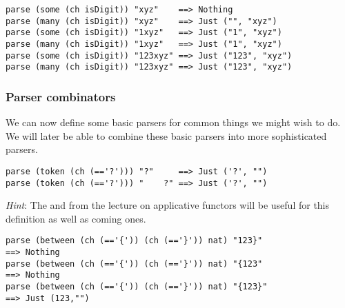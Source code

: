 \begin{verbatim}
parse (some (ch isDigit)) "xyz"    ==> Nothing
parse (many (ch isDigit)) "xyz"    ==> Just ("", "xyz")
parse (some (ch isDigit)) "1xyz"   ==> Just ("1", "xyz")
parse (many (ch isDigit)) "1xyz"   ==> Just ("1", "xyz")
parse (some (ch isDigit)) "123xyz" ==> Just ("123", "xyz")
parse (many (ch isDigit)) "123xyz" ==> Just ("123", "xyz")
\end{verbatim}

\taskLine

\subsubsection{Parser combinators}

We can now define some basic parsers for common things we might wish to do. We will later be able to combine these basic parsers into more sophisticated parsers. 

\taskLine 

\begin{verbatim}
parse (token (ch (=='?'))) "?"     ==> Just ('?', "")
parse (token (ch (=='?'))) "    ?" ==> Just ('?', "")
\end{verbatim}
\emph{Hint}: The \haskellIn{(*>)} and \haskellIn{(<*)} from the lecture on applicative functors will be useful for this definition as well as coming ones.

\begin{verbatim}
parse (between (ch (=='{')) (ch (=='}')) nat) "123}"  
==> Nothing
parse (between (ch (=='{')) (ch (=='}')) nat) "{123"  
==> Nothing
parse (between (ch (=='{')) (ch (=='}')) nat) "{123}" 
==> Just (123,"") 
\end{verbatim}

